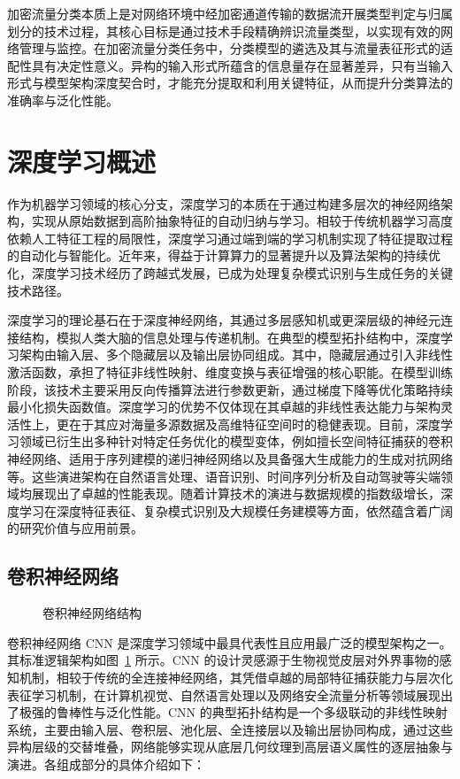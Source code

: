 加密流量分类本质上是对网络环境中经加密通道传输的数据流开展类型判定与归属划分的技术过程，其核心目标是通过技术手段精确辨识流量类型，以实现有效的网络管理与监控。在加密流量分类任务中，分类模型的遴选及其与流量表征形式的适配性具有决定性意义。异构的输入形式所蕴含的信息量存在显著差异，只有当输入形式与模型架构深度契合时，才能充分提取和利用关键特征，从而提升分类算法的准确率与泛化性能。

\section{深度学习概述}
作为机器学习领域的核心分支，深度学习的本质在于通过构建多层次的神经网络架构，实现从原始数据到高阶抽象特征的自动归纳与学习\cite{lecun2015deep}。相较于传统机器学习高度依赖人工特征工程的局限性，深度学习通过端到端的学习机制实现了特征提取过程的自动化与智能化。近年来，得益于计算算力的显著提升以及算法架构的持续优化，深度学习技术经历了跨越式发展，已成为处理复杂模式识别与生成任务的关键技术路径。

深度学习的理论基石在于深度神经网络，其通过多层感知机或更深层级的神经元连接结构，模拟人类大脑的信息处理与传递机制。在典型的模型拓扑结构中，深度学习架构由输入层、多个隐藏层以及输出层协同组成。其中，隐藏层通过引入非线性激活函数，承担了特征非线性映射、维度变换与表征增强的核心职能。在模型训练阶段，该技术主要采用反向传播算法进行参数更新，通过梯度下降等优化策略持续最小化损失函数值\cite{almeida2020multilayer}。深度学习的优势不仅体现在其卓越的非线性表达能力与架构灵活性上，更在于其应对海量多源数据及高维特征空间时的稳健表现。目前，深度学习领域已衍生出多种针对特定任务优化的模型变体，例如擅长空间特征捕获的卷积神经网络、适用于序列建模的递归神经网络以及具备强大生成能力的生成对抗网络等\cite{cong2023review,sherstinsky2020fundamentals,goodfellow2020generative}。这些演进架构在自然语言处理、语音识别、时间序列分析及自动驾驶等尖端领域均展现出了卓越的性能表现\cite{lauriola2022introduction,kheddar2024automatic,zamanzadeh2024deep,bachute2021autonomous}。随着计算技术的演进与数据规模的指数级增长，深度学习在深度特征表征、复杂模式识别及大规模任务建模等方面，依然蕴含着广阔的研究价值与应用前景\cite{zhang2024deep}。

\subsection{卷积神经网络}
\begin{figure}[ht]
  \centering
  \caption{卷积神经网络结构}
  \label{fig:cnn}
\end{figure}
卷积神经网络 CNN 是深度学习领域中最具代表性且应用最广泛的模型架构之一。其标准逻辑架构如图~\ref{fig:cnn} 所示。CNN 的设计灵感源于生物视觉皮层对外界事物的感知机制，相较于传统的全连接神经网络，其凭借卓越的局部特征捕获能力与层次化表征学习机制，在计算机视觉、自然语言处理以及网络安全流量分析等领域展现出了极强的鲁棒性与泛化性能。CNN 的典型拓扑结构是一个多级联动的非线性映射系统，主要由输入层、卷积层、池化层、全连接层以及输出层协同构成，通过这些异构层级的交替堆叠，网络能够实现从底层几何纹理到高层语义属性的逐层抽象与演进。各组成部分的具体介绍如下：


